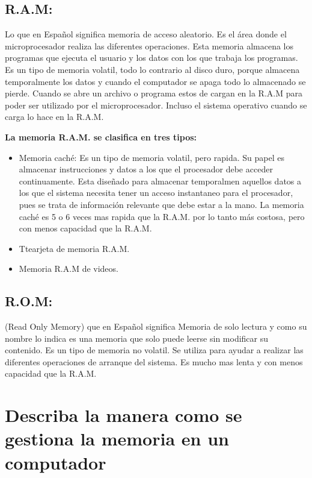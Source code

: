 \documentclass{article}
\begin{document}
\subsection{R.A.M:} \label{contenido} Lo que en Español significa memoria de acceso aleatorio. Es el área donde el microprocesador realiza las diferentes operaciones. Esta memoria almacena los programas que ejecuta el usuario y los datos con los que trabaja los programas.
Es un tipo de memoria volatil, todo lo contrario al disco duro, porque almacena temporalmente los datos y cuando el computador se apaga todo lo almacenado se pierde. 
Cuando se abre un archivo o programa estos de cargan en la R.A.M para poder ser utilizado por el microprocesador. Incluso el sistema operativo cuando se carga lo hace en la R.A.M.

\vspace{1cm}

\textbf{La memoria R.A.M. se clasifica en tres tipos:}
\begin{itemize}
    \item Memoria caché: Es un tipo de memoria volatil, pero rapida. Su papel es almacenar instrucciones y datos a los que el procesador debe acceder continuamente. 
    Esta diseñado para almacenar temporalmen aquellos datos a los que el sistema necesita tener un acceso instantaneo para el procesador, pues se trata de información relevante que debe estar a la mano.
    La memoria caché es 5 o 6 veces mas rapida que la R.A.M. por lo tanto más costosa, pero con menos capacidad que la R.A.M.\cite{2website}
     \item Ttearjeta de memoria R.A.M.
    \item Memoria R.A.M de videos.
\end{itemize}

\subsection{R.O.M:} \label{contenido} (Read Only Memory) que en Español significa Memoria de solo lectura y como su nombre lo indica es una memoria que solo puede leerse sin modificar su contenido. Es un tipo de memoria no volatil. Se utiliza para ayudar a realizar las diferentes operaciones de arranque del sistema.
Es mucho mas lenta y con menos capacidad que la R.A.M.

\section{Describa la manera como se gestiona la memoria en un computador}
\end{document}
